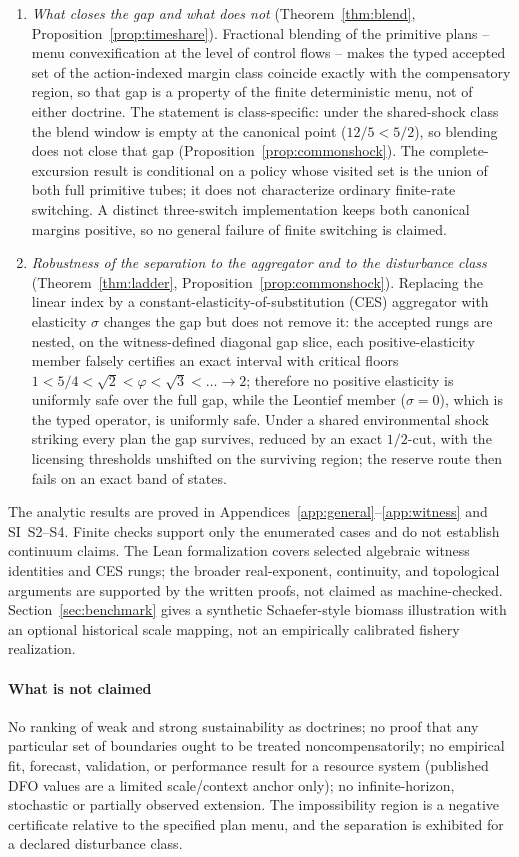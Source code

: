 \documentclass[preprint,11pt,authoryear]{elsarticle}
\theoremstyle{definition}
\theoremstyle{remark}
\begin{document}
\begin{enumerate}[leftmargin=2em,label=(\roman*)]
\item \emph{What closes the gap and what does not} (Theorem~\ref{thm:blend}, Proposition~\ref{prop:timeshare}). Fractional blending of the primitive plans -- menu convexification at the level of control flows -- makes the typed accepted set of the action-indexed margin class coincide exactly with the compensatory region, so that gap is a property of the finite deterministic menu, not of either doctrine. The statement is class-specific: under the shared-shock class the blend window is empty at the canonical point ($12/5<5/2$), so blending does not close that gap (Proposition~\ref{prop:commonshock}). The complete-excursion result is conditional on a policy whose visited set is the union of both full primitive tubes; it does not characterize ordinary finite-rate switching. A distinct three-switch implementation keeps both canonical margins positive, so no general failure of finite switching is claimed.
\item \emph{Robustness of the separation to the aggregator and to the disturbance class} (Theorem~\ref{thm:ladder}, Proposition~\ref{prop:commonshock}). Replacing the linear index by a constant-elasticity-of-substitution (CES) aggregator with elasticity $\sigma$ changes the gap but does not remove it: the accepted rungs are nested, on the witness-defined diagonal gap slice, each positive-elasticity member falsely certifies an exact interval with critical floors $1<5/4<\sqrt2<\varphi<\sqrt3<\dots\to2$; therefore no positive elasticity is uniformly safe over the full gap, while the Leontief member ($\sigma=0$), which is the typed operator, is uniformly safe. Under a shared environmental shock striking every plan the gap survives, reduced by an exact $1/2$-cut, with the licensing thresholds unshifted on the surviving region; the reserve route then fails on an exact band of states.
\end{enumerate}
The analytic results are proved in Appendices~\ref{app:general}--\ref{app:witness} and SI~S2--S4. Finite checks support only the enumerated cases and do not establish continuum claims. The Lean formalization covers selected algebraic witness identities and CES rungs; the broader real-exponent, continuity, and topological arguments are supported by the written proofs, not claimed as machine-checked. Section~\ref{sec:benchmark} gives a synthetic Schaefer-style biomass illustration with an optional historical scale mapping, not an empirically calibrated fishery realization.

\paragraph{What is not claimed} No ranking of weak and strong sustainability as doctrines; no proof that any particular set of boundaries ought to be treated noncompensatorily; no empirical fit, forecast, validation, or performance result for a resource system (published DFO values are a limited scale/context anchor only); no infinite-horizon, stochastic or partially observed extension. The impossibility region is a negative certificate relative to the specified plan menu, and the separation is exhibited for a declared disturbance class.
\end{document}

